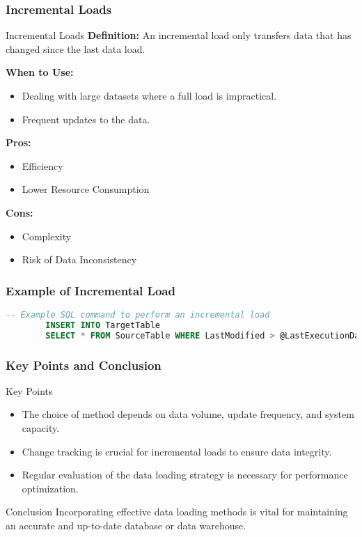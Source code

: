 \documentclass[aspectratio=169]{beamer}
\begin{document}
\begin{frame}[fragile]
    \frametitle{Incremental Loads}
    \begin{block}{Incremental Loads}
        \textbf{Definition:} An incremental load only transfers data that has changed since the last data load.
        
        \textbf{When to Use:}
        \begin{itemize}
            \item Dealing with large datasets where a full load is impractical.
            \item Frequent updates to the data.
        \end{itemize}
        
        \textbf{Pros:}
        \begin{itemize}
            \item Efficiency
            \item Lower Resource Consumption
        \end{itemize}
        
        \textbf{Cons:}
        \begin{itemize}
            \item Complexity
            \item Risk of Data Inconsistency
        \end{itemize}
    \end{block}
\end{frame}

\begin{frame}[fragile]
    \frametitle{Example of Incremental Load}
    \begin{lstlisting}[language=SQL]
        -- Example SQL command to perform an incremental load 
        INSERT INTO TargetTable 
        SELECT * FROM SourceTable WHERE LastModified > @LastExecutionDate;
    \end{lstlisting}
\end{frame}

\begin{frame}[fragile]
    \frametitle{Key Points and Conclusion}
    \begin{block}{Key Points}
        \begin{itemize}
            \item The choice of method depends on data volume, update frequency, and system capacity.
            \item Change tracking is crucial for incremental loads to ensure data integrity.
            \item Regular evaluation of the data loading strategy is necessary for performance optimization.
        \end{itemize}
    \end{block}
    
    \begin{block}{Conclusion}
        Incorporating effective data loading methods is vital for maintaining an accurate and up-to-date database or data warehouse.
    \end{block}
\end{frame}
\end{document}
